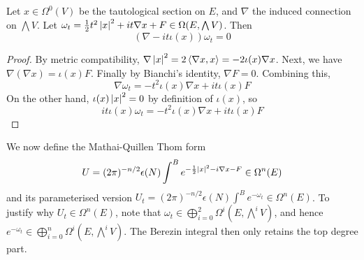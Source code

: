 \begin{prop} \label{prop:closed_prop} %
	Let $x \in \Omega^0(V)$ be the tautological section on $E$, and $\nabla$ the
	induced connection on $\bigwedge V$.
	Let $\omega_t = \frac{1}{2}t^2\abs{x}^2 + it\nabla x + F 
	\in \Omega(E,\bigwedge V)$. Then 
	\[
		(\nabla - it\iota(x))\omega_t = 0
	\] 
\end{prop}
\begin{proof}
	 By metric compatibility,
	$\nabla \abs{x}^2 = 2\gen{\nabla x, x} = -2\iota(x)\nabla x$.
	Next, we have $\nabla(\nabla x) = \iota(x) F$.
	Finally by Bianchi's identity, $\nabla F = 0$. Combining this,
	\[
	\nabla \omega_t = -t^2\iota(x) \nabla x + it\iota(x)F 
	\] 
	On the other hand, $\iota(x)\abs{x}^2 = 0$ by definition of $\iota(x)$, so
	\[
	it\iota(x)\omega_t = -t^2\iota(x) \nabla x + it\iota(x)F
	\] 
\end{proof}

We now define the Mathai-Quillen Thom form 
\begin{equation}
	U = (2\pi)^{-n/2}\epsilon(N) \int^B e^{-\frac{1}{2}\abs{x}^2-i\nabla x - F} \in \Omega^n(E)
\end{equation}
and its parameterised version $U_t = (2\pi)^{-n/2}\epsilon(N) \int^B e^{-\omega_t} \in
\Omega^n(E)$. To justify why $U_t\in\Omega^n(E)$, note that
$\omega_t\in\bigoplus_{i=0}^2 \Omega^i(E,\bigwedge^iV)$, and hence 
$e^{-\omega_t} \in \bigoplus_{i=0}^n \Omega^i(E,\bigwedge^iV)$. The Berezin
integral then only retains the top degree part. 

